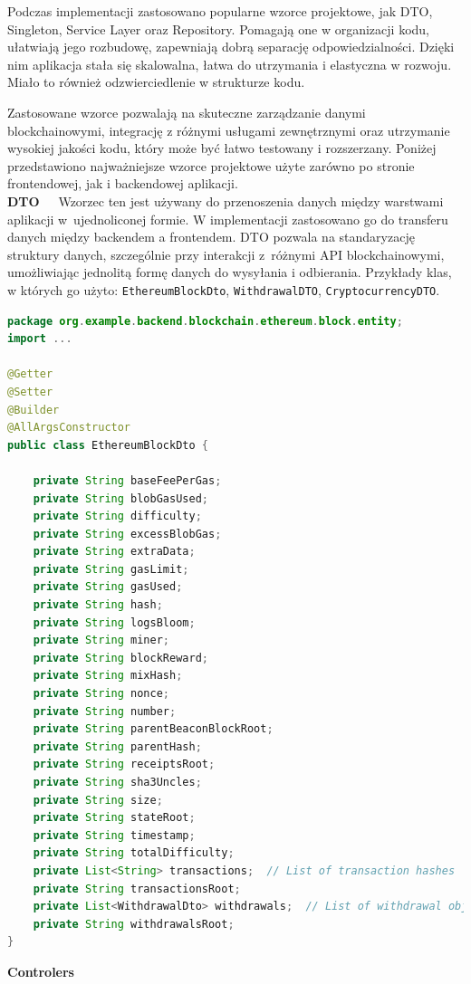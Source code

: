 Podczas implementacji zastosowano popularne wzorce projektowe, jak DTO, Singleton, Service Layer oraz Repository. Pomagają one w organizacji kodu, ułatwiają jego rozbudowę, zapewniają dobrą separację odpowiedzialności. Dzięki nim aplikacja stała się skalowalna, łatwa do utrzymania i elastyczna w rozwoju. Miało to również odzwierciedlenie w strukturze kodu.

Zastosowane wzorce pozwalają na skuteczne zarządzanie danymi blockchainowymi, integrację z różnymi usługami zewnętrznymi oraz utrzymanie wysokiej jakości kodu, który może być łatwo testowany i rozszerzany. Poniżej przedstawiono najważniejsze wzorce projektowe użyte zarówno po stronie frontendowej, jak i backendowej aplikacji.\\[-10pt]

\noindent \textbf{DTO~~}
Wzorzec ten jest używany do przenoszenia danych między warstwami aplikacji w~ujednoliconej formie. W implementacji zastosowano go do transferu danych między backendem a frontendem. DTO pozwala na standaryzację struktury danych, szczególnie przy interakcji z~różnymi API blockchainowymi, umożliwiając jednolitą formę danych do wysyłania i odbierania. Przykłady klas, w których go użyto: \texttt{EthereumBlockDto}, \texttt{WithdrawalDTO}, \texttt{CryptocurrencyDTO}.\\[-10pt]
\begin{lstlisting}[language=Java, style=JavaStyle]
package org.example.backend.blockchain.ethereum.block.entity;
import ...

@Getter
@Setter
@Builder
@AllArgsConstructor
public class EthereumBlockDto {
	
	private String baseFeePerGas;
	private String blobGasUsed;
	private String difficulty;
	private String excessBlobGas;
	private String extraData;
	private String gasLimit;
	private String gasUsed;
	private String hash;
	private String logsBloom;
	private String miner;
	private String blockReward;
	private String mixHash;
	private String nonce;
	private String number;
	private String parentBeaconBlockRoot;
	private String parentHash;
	private String receiptsRoot;
	private String sha3Uncles;
	private String size;
	private String stateRoot;
	private String timestamp;
	private String totalDifficulty;
	private List<String> transactions;  // List of transaction hashes
	private String transactionsRoot;
	private List<WithdrawalDto> withdrawals;  // List of withdrawal objects
	private String withdrawalsRoot;
}

\end{lstlisting}
\noindent \textbf{Controlers~~}
